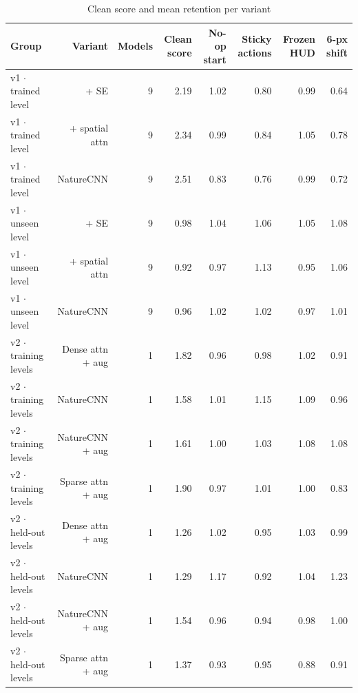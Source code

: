 \begin{table}[t]
\centering
\caption{Clean score and mean retention per variant}
\label{tab:robustness_by_variant}
\begin{tabular}{lrrrrrrr}
\toprule
Group & Variant & Models & Clean score & No-op start & Sticky actions & Frozen HUD & 6-px shift \\
\midrule
v1 $\cdot$ trained level & + SE & 9 & 2.19 & 1.02 & 0.80 & 0.99 & 0.64 \\
v1 $\cdot$ trained level & + spatial attn & 9 & 2.34 & 0.99 & 0.84 & 1.05 & 0.78 \\
v1 $\cdot$ trained level & NatureCNN & 9 & 2.51 & 0.83 & 0.76 & 0.99 & 0.72 \\
v1 $\cdot$ unseen level & + SE & 9 & 0.98 & 1.04 & 1.06 & 1.05 & 1.08 \\
v1 $\cdot$ unseen level & + spatial attn & 9 & 0.92 & 0.97 & 1.13 & 0.95 & 1.06 \\
v1 $\cdot$ unseen level & NatureCNN & 9 & 0.96 & 1.02 & 1.02 & 0.97 & 1.01 \\
v2 $\cdot$ training levels & Dense attn + aug & 1 & 1.82 & 0.96 & 0.98 & 1.02 & 0.91 \\
v2 $\cdot$ training levels & NatureCNN & 1 & 1.58 & 1.01 & 1.15 & 1.09 & 0.96 \\
v2 $\cdot$ training levels & NatureCNN + aug & 1 & 1.61 & 1.00 & 1.03 & 1.08 & 1.08 \\
v2 $\cdot$ training levels & Sparse attn + aug & 1 & 1.90 & 0.97 & 1.01 & 1.00 & 0.83 \\
v2 $\cdot$ held-out levels & Dense attn + aug & 1 & 1.26 & 1.02 & 0.95 & 1.03 & 0.99 \\
v2 $\cdot$ held-out levels & NatureCNN & 1 & 1.29 & 1.17 & 0.92 & 1.04 & 1.23 \\
v2 $\cdot$ held-out levels & NatureCNN + aug & 1 & 1.54 & 0.96 & 0.94 & 0.98 & 1.00 \\
v2 $\cdot$ held-out levels & Sparse attn + aug & 1 & 1.37 & 0.93 & 0.95 & 0.88 & 0.91 \\
\bottomrule
\end{tabular}
\end{table}
